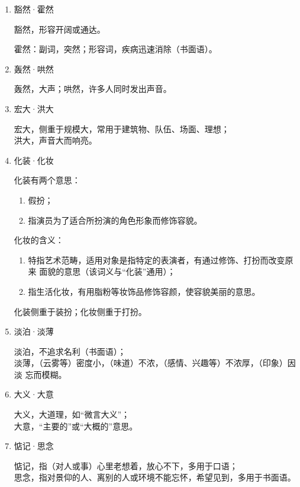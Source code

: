 \documentclass[final,oneside]{ctexbook}
\begin{document}
\begin{enumerate}
    激发，指刺激使兴奋。

  \item 豁然·霍然

    豁然，形容开阔或通达。

    霍然：副词，突然；形容词，疾病迅速消除（书面语）。

  \item 轰然·哄然

    轰然，大声；哄然，许多人同时发出声音。

  \item 宏大·洪大

    宏大，侧重于规模大，常用于建筑物、队伍、场面、理想；\\
    洪大，声音大而响亮。

  \item 化装·化妆

    化装有两个意思：
    \begin{enumerate}
      \item 假扮；
      \item 指演员为了适合所扮演的角色形象而修饰容貌。
    \end{enumerate}

    化妆的含义：

    \begin{enumerate}
      \item 特指艺术范畴，适用对象是指特定的表演者，有通过修饰、打扮而改变原来
        面貌的意思（该词义与“化装”通用）；
      \item 指生活化妆，有用脂粉等妆饰品修饰容颜，使容貌美丽的意思。
    \end{enumerate}

    化装侧重于装扮；化妆侧重于打扮。

  \item 淡泊·淡薄

    淡泊，不追求名利（书面语）；\\
    淡薄，（云雾等）密度小，（味道）不浓，（感情、兴趣等）不浓厚，（印象）因淡
    忘而模糊。

  \item 大义·大意

    大义，大道理，如“微言大义”；\\
    大意，“主要的”或“大概的”意思。

  \item 惦记·思念

    惦记，指（对人或事）心里老想着，放心不下，多用于口语；\\
    思念，指对景仰的人、离别的人或环境不能忘怀，希望见到，多用于书面语。


\end{enumerate}
\end{document}
